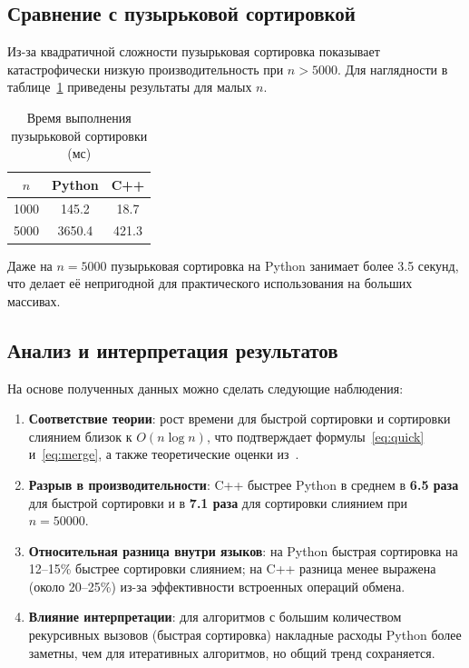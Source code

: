 \subsection{Сравнение с пузырьковой сортировкой}

Из-за квадратичной сложности пузырьковая сортировка показывает катастрофически низкую производительность при $n > 5000$. Для наглядности в таблице~\ref{tab:bubble} приведены результаты для малых $n$.

\begin{table}[H]
\centering
\caption{Время выполнения пузырьковой сортировки (мс)}
\label{tab:bubble}
\begin{tabular}{|c|c|c|}
\hline
\textbf{$n$} & \textbf{Python} & \textbf{C++} \\
\hline
1000 & 145.2 & 18.7 \\
\hline
5000 & 3650.4 & 421.3 \\
\hline
\end{tabular}
\end{table}

Даже на $n=5000$ пузырьковая сортировка на Python занимает более 3.5 секунд, что делает её непригодной для практического использования на больших массивах.

\subsection{Анализ и интерпретация результатов}

На основе полученных данных можно сделать следующие наблюдения:

\begin{enumerate}
    \item \textbf{Соответствие теории}: рост времени для быстрой сортировки и сортировки слиянием близок к $O(n \log n)$, что подтверждает формулы~\ref{eq:quick} и~\ref{eq:merge}, а также теоретические оценки из~\cite{cormen2009}.
    \item \textbf{Разрыв в производительности}: C++ быстрее Python в среднем в \textbf{6.5 раза} для быстрой сортировки и в \textbf{7.1 раза} для сортировки слиянием при $n=50000$.
    \item \textbf{Относительная разница внутри языков}: на Python быстрая сортировка на 12--15\% быстрее сортировки слиянием; на C++ разница менее выражена (около 20--25\%) из-за эффективности встроенных операций обмена.
    \item \textbf{Влияние интерпретации}: для алгоритмов с большим количеством рекурсивных вызовов (быстрая сортировка) накладные расходы Python более заметны, чем для итеративных алгоритмов, но общий тренд сохраняется.
\end{enumerate}

